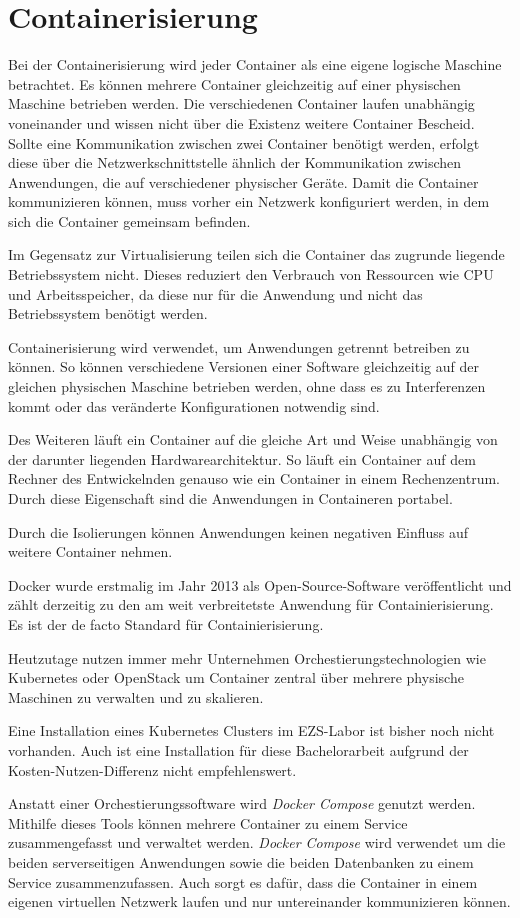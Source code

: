 \section{Containerisierung} \label{sec:Containerisierung}
Bei der Containerisierung wird jeder Container als eine eigene logische Maschine betrachtet. Es können mehrere Container gleichzeitig auf einer physischen Maschine betrieben werden. 
Die verschiedenen Container laufen unabhängig voneinander und wissen nicht über die Existenz weitere Container Bescheid. Sollte eine Kommunikation zwischen zwei Container benötigt werden, erfolgt diese über die Netzwerkschnittstelle ähnlich der Kommunikation zwischen Anwendungen, die auf verschiedener physischer Geräte. Damit die Container kommunizieren können, muss vorher ein Netzwerk konfiguriert werden, in dem sich die Container gemeinsam befinden.

Im Gegensatz zur Virtualisierung teilen sich die Container das zugrunde liegende Betriebssystem nicht. Dieses reduziert den Verbrauch von Ressourcen wie CPU und Arbeitsspeicher, da diese nur für die Anwendung und nicht das Betriebssystem benötigt werden.

Containerisierung wird verwendet, um Anwendungen getrennt betreiben zu können. So können verschiedene Versionen einer Software gleichzeitig auf der gleichen physischen Maschine betrieben werden, ohne dass es zu Interferenzen kommt oder das veränderte Konfigurationen notwendig sind.

Des Weiteren läuft ein Container auf die gleiche Art und Weise unabhängig von der darunter liegenden Hardwarearchitektur. So läuft ein Container auf dem Rechner des Entwickelnden genauso wie ein Container in einem Rechenzentrum. Durch diese Eigenschaft sind die Anwendungen in Containeren portabel.

Durch die Isolierungen können Anwendungen keinen negativen Einfluss auf weitere Container nehmen.

Docker wurde erstmalig im Jahr 2013 als Open-Source-Software veröffentlicht und zählt derzeitig zu den am weit verbreitetste Anwendung für Containierisierung. Es ist der de facto Standard für Containierisierung. 
\cite{boersmaContainerizationDefinitionBest2019}

Heutzutage nutzen immer mehr Unternehmen Orchestierungstechnologien wie Kubernetes oder OpenStack um Container zentral über mehrere physische Maschinen zu verwalten und zu skalieren.
\cite{gaviganHistoryAngular2018}

Eine Installation eines Kubernetes Clusters im EZS-Labor ist bisher noch nicht vorhanden. Auch ist eine Installation für diese Bachelorarbeit aufgrund der Kosten-Nutzen-Differenz nicht empfehlenswert.

Anstatt einer Orchestierungssoftware wird \textit{Docker Compose} genutzt werden.
Mithilfe dieses Tools können mehrere Container zu einem Service zusammengefasst und verwaltet werden. \textit{Docker Compose} wird verwendet um die beiden serverseitigen Anwendungen sowie die beiden Datenbanken zu einem Service zusammenzufassen. Auch sorgt es dafür, dass die Container in einem eigenen virtuellen Netzwerk laufen und nur untereinander kommunizieren können. \cite{dockerinc.OverviewDockerCompose2020} 